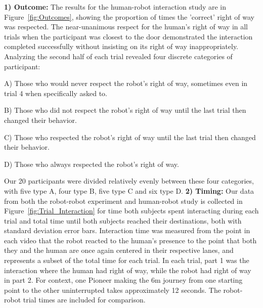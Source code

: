 \documentclass[letterpaper, 10 pt, conference]{ieeeconf}  %
\begin{document}
\textbf{1) Outcome:} The results for the human-robot interaction study are in Figure~\ref{fig:Outcomes}, showing the proportion of times the 'correct' right of way was respected. The near-unanimous respect for the human's right of way in all trials when the participant was closest to the door demonstrated the interaction completed successfully without insisting on its right of way inappropriately. Analyzing the second half of each trial revealed four discrete categories of participant: 

A) Those who would never respect the robot's right of way, sometimes even in trial 4 when specifically asked to. 

B) Those who did not respect the robot's right of way until the last trial then changed their behavior. 

C) Those who respected the robot's right of way until the last trial then changed their behavior. 

D) Those who always respected the robot's right of way. 

Our 20 participants were divided relatively evenly between these four categories, with five type A, four type B, five type C and six type D.
\textbf{2) Timing:} Our data from both the robot-robot experiment and human-robot study is collected in Figure~\ref{fig:Trial_Interaction} for time both subjects spent interacting during each trial and total time until both subjects reached their destinations, both with standard deviation error bars. Interaction time was measured from the point in each video that the robot reacted to the human's presence to the point that both they and the human are once again centered in their respective lanes, and represents a subset of the total time for each trial. In each trial, part 1 was the interaction where the human had right of way, while the robot had right of way in part 2. For context, one Pioneer making the 6m journey from one starting point to the other uninterrupted takes approximately 12 seconds. The robot-robot trial times are included for comparison.  



   
\end{document}
